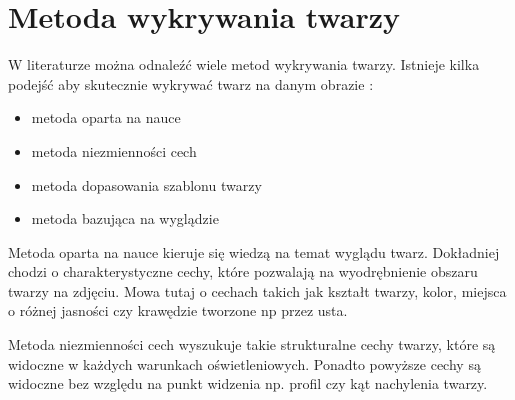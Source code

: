 \documentclass[a4paper,twoside,12pt]{book}
\begin{document}
    \section{Metoda wykrywania twarzy}\label{sec:metodaWykrywaniaTwarzy}
    W literaturze można odnaleźć wiele metod wykrywania twarzy.
    Istnieje kilka podejść aby skutecznie wykrywać twarz na danym obrazie \cite{mehdiRizvi}:

    \begin{itemize}
        \item metoda oparta na nauce
        \item metoda niezmienności cech
        \item metoda dopasowania szablonu twarzy
        \item metoda bazująca na wyglądzie
    \end{itemize}
    Metoda oparta na nauce kieruje się wiedzą na temat wyglądu twarz.
    Dokładniej chodzi o charakterystyczne cechy,
    które pozwalają na wyodrębnienie obszaru twarzy na zdjęciu.
    Mowa tutaj o cechach takich jak kształt twarzy, kolor, miejsca o różnej jasności czy krawędzie tworzone np przez
    usta.

    Metoda niezmienności cech wyszukuje takie strukturalne cechy twarzy, które są widoczne w każdych warunkach
    oświetleniowych.
    Ponadto powyższe cechy są widoczne bez względu na punkt widzenia np.
    profil czy kąt nachylenia twarzy.
\end{document}
